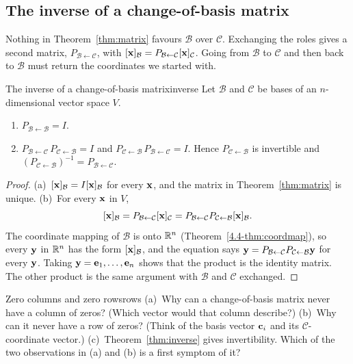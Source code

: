 \documentclass[11pt]{article}
\begin{document}
\subsection*{The inverse of a change-of-basis matrix}

Nothing in Theorem~\ref{thm:matrix} favours $\mathcal{B}$ over $\mathcal{C}$. Exchanging the roles gives a second matrix, $P_{\mathcal{B}\leftarrow\mathcal{C}}$, with $[\mathbf{x}]_{\mathcal{B}}=P_{\mathcal{B}\leftarrow\mathcal{C}}[\mathbf{x}]_{\mathcal{C}}$. Going from $\mathcal{B}$ to $\mathcal{C}$ and then back to $\mathcal{B}$ must return the coordinates we started with.

\begin{thm}{The inverse of a change-of-basis matrix}{inverse}
Let $\mathcal{B}$ and $\mathcal{C}$ be bases of an $n$-dimensional vector space $V$.
\begin{enumerate}[label=(\alph*),itemsep=1pt]
  \item $P_{\mathcal{B}\leftarrow\mathcal{B}}=I$.
  \item $P_{\mathcal{B}\leftarrow\mathcal{C}}\,P_{\mathcal{C}\leftarrow\mathcal{B}}=I$ and $P_{\mathcal{C}\leftarrow\mathcal{B}}\,P_{\mathcal{B}\leftarrow\mathcal{C}}=I$. Hence $P_{\mathcal{C}\leftarrow\mathcal{B}}$ is invertible and $\left(P_{\mathcal{C}\leftarrow\mathcal{B}}\right)^{-1}=P_{\mathcal{B}\leftarrow\mathcal{C}}$.
\end{enumerate}
\end{thm}

\begin{proof}
(a)~$[\mathbf{x}]_{\mathcal{B}}=I[\mathbf{x}]_{\mathcal{B}}$ for every $\mathbf{x}$, and the matrix in Theorem~\ref{thm:matrix} is unique. (b)~For every $\mathbf{x}$ in $V$,
\[
[\mathbf{x}]_{\mathcal{B}}=P_{\mathcal{B}\leftarrow\mathcal{C}}[\mathbf{x}]_{\mathcal{C}}=P_{\mathcal{B}\leftarrow\mathcal{C}}P_{\mathcal{C}\leftarrow\mathcal{B}}[\mathbf{x}]_{\mathcal{B}}.
\]
The coordinate mapping of $\mathcal{B}$ is onto $\mathbb{R}^n$ (Theorem~\ref{4.4-thm:coordmap}), so every $\mathbf{y}$ in $\mathbb{R}^n$ has the form $[\mathbf{x}]_{\mathcal{B}}$, and the equation says $\mathbf{y}=P_{\mathcal{B}\leftarrow\mathcal{C}}P_{\mathcal{C}\leftarrow\mathcal{B}}\mathbf{y}$ for every $\mathbf{y}$. Taking $\mathbf{y}=\mathbf{e}_1,\dots,\mathbf{e}_n$ shows that the product is the identity matrix. The other product is the same argument with $\mathcal{B}$ and $\mathcal{C}$ exchanged.
\end{proof}

\begin{think}{Zero columns and zero rows}{rows}
(a)~Why can a change-of-basis matrix never have a column of zeros? (Which vector would that column describe?) (b)~Why can it never have a row of zeros? (Think of the basis vector $\mathbf{c}_i$ and its $\mathcal{C}$-coordinate vector.) (c)~Theorem~\ref{thm:inverse} gives invertibility. Which of the two observations in (a) and (b) is a first symptom of it?
\end{think}
\end{document}
